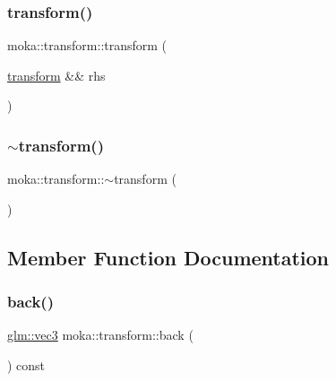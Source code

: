 \mbox{\label{classmoka_1_1transform_a321493f9e8b4013b7db93b719d471568}} 
\subsubsection{\texorpdfstring{transform()}{transform()}\hspace{0.1cm}{\footnotesize\ttfamily [4/4]}}
{\footnotesize\ttfamily moka\+::transform\+::transform (\begin{DoxyParamCaption}\item[{\mbox{\hyperlink{classmoka_1_1transform}{transform}} \&\&}]{rhs }\end{DoxyParamCaption})\hspace{0.3cm}{\ttfamily [noexcept]}}

\mbox{\label{classmoka_1_1transform_a4469fa3b4f998c8c008e2ca02fc54944}} 
\subsubsection{\texorpdfstring{$\sim$transform()}{~transform()}}
{\footnotesize\ttfamily moka\+::transform\+::$\sim$transform (\begin{DoxyParamCaption}{ }\end{DoxyParamCaption})\hspace{0.3cm}{\ttfamily [default]}}



\subsection{Member Function Documentation}
\mbox{\label{classmoka_1_1transform_a2604b09d17efee979a6180763860ed81}} 
\subsubsection{\texorpdfstring{back()}{back()}}
{\footnotesize\ttfamily \mbox{\hyperlink{namespacemoka_aed2224bc0e5b79e57a8975ded94ee1aaa97ade28e93c0de60adc075bdbe07ca36}{glm\+::vec3}} moka\+::transform\+::back (\begin{DoxyParamCaption}{ }\end{DoxyParamCaption}) const}



